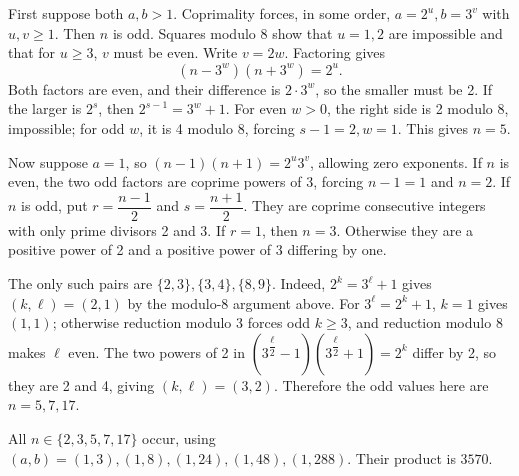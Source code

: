 First suppose both $a,b>1$. Coprimality forces, in some order, $a=2^u,b=3^v$ with $u,v\ge1$. Then $n$ is odd. Squares modulo 8 show that $u=1,2$ are impossible and that for $u\ge3$, $v$ must be even. Write $v=2w$. Factoring gives
\[(n-3^w)(n+3^w)=2^u.\]
Both factors are even, and their difference is $2\cdot3^w$, so the smaller must be 2. If the larger is $2^s$, then $2^{s-1}=3^w+1$. For even $w>0$, the right side is 2 modulo 8, impossible; for odd $w$, it is 4 modulo 8, forcing $s-1=2,w=1$. This gives $n=5$.

Now suppose $a=1$, so $(n-1)(n+1)=2^u3^v$, allowing zero exponents. If $n$ is even, the two odd factors are coprime powers of 3, forcing $n-1=1$ and $n=2$. If $n$ is odd, put $r=\dfrac{n-1}{2}$ and $s=\dfrac{n+1}{2}$. They are coprime consecutive integers with only prime divisors 2 and 3. If $r=1$, then $n=3$. Otherwise they are a positive power of 2 and a positive power of 3 differing by one.

The only such pairs are $\{2,3\},\{3,4\},\{8,9\}$. Indeed, $2^k=3^\ell+1$ gives $(k,\ell)=(2,1)$ by the modulo-8 argument above. For $3^\ell=2^k+1$, $k=1$ gives $(1,1)$; otherwise reduction modulo 3 forces odd $k\ge3$, and reduction modulo 8 makes $\ell$ even. The two powers of 2 in $(3^{\dfrac{\ell}{2}}-1)(3^{\dfrac{\ell}{2}}+1)=2^k$ differ by 2, so they are 2 and 4, giving $(k,\ell)=(3,2)$. Therefore the odd values here are $n=5,7,17$.

All $n\in\{2,3,5,7,17\}$ occur, using $(a,b)=(1,3),(1,8),(1,24),(1,48),(1,288)$. Their product is $\boxed{3570}$.
